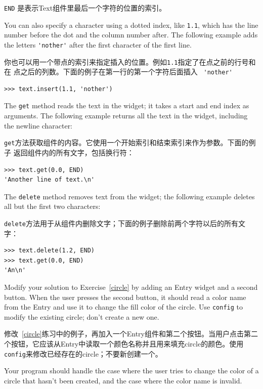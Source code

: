 \documentclass[10pt]{book}
\begin{document}
\begin{CJK}{UTF8}{gbsn}
{\tt END} 是表示Text组件里最后一个字符的位置的索引。

You can also specify a character using a dotted index, like {\tt 1.1},
which has the line number before the dot and the column number after.
The following example adds the letters \verb"'nother'" after the first
character of the first line.

你也可以用一个带点的索引来指定插入的位置。例如{\tt 1.1}指定了在点之前的行号和在
点之后的列数。下面的例子在第一行的第一个字符后面插入 \verb" 'nother' "

\begin{verbatim}
>>> text.insert(1.1, 'nother')
\end{verbatim}
%
The {\tt get} method reads the text in the widget; it takes a start
and end index as arguments.  The following example returns all the
text in the widget, including the newline character:

{\tt get}方法获取组件的内容。它使用一个开始索引和结束索引来作为参数。下面的例子
返回组件内的所有文字，包括换行符：

\begin{verbatim}
>>> text.get(0.0, END)
'Another line of text.\n'
\end{verbatim}
%
The {\tt delete} method removes text from the widget;
the following example deletes all but the first two characters:

{\tt delete}方法用于从组件内删除文字；下面的例子删除前两个字符以后的所有文字：

\begin{verbatim}
>>> text.delete(1.2, END)
>>> text.get(0.0, END)
'An\n'
\end{verbatim}
%

\begin{exercise}
\label{circle2}

Modify your solution to Exercise~\ref{circle} by adding an
Entry widget and a second button.  When the user presses the
second button, it should read a color name from the Entry and
use it to change the fill color of the circle.  Use {\tt config}
to modify the existing circle; don't create a new one.

修改~\ref{circle}练习中的例子，再加入一个Entry组件和第二个按钮。当用户点击第二
个按钮，它应该从Entry中读取一个颜色名称并且用来填充circle的颜色。使用{\tt
config}来修改已经存在的circle；不要新创建一个。

Your program should handle the case where the user tries to
change the color of a circle that hasn't been created, and
the case where the color name is invalid.


\end{exercise}
\end{CJK}
\end{document}
